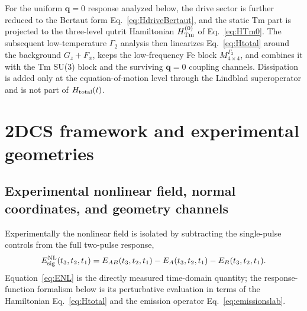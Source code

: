 \documentclass[reprint,amsmath,amssymb,aps,prb,longbibliography]{revtex4-2}
\begin{document}
For the uniform $\mathbf q=0$ response analyzed below, the drive sector is
further reduced to the Bertaut form Eq.~\eqref{eq:HdriveBertaut}, and the
static Tm part is projected to the three-level qutrit Hamiltonian
$H_{\rm Tm}^{(0)}$ of Eq.~\eqref{eq:HTm0}. The subsequent low-temperature
$\Gamma_2$ analysis then linearizes Eq.~\eqref{eq:Htotal} around the
background $G_z+F_x$, keeps the low-frequency Fe block
$M^{\Gamma_2}_{4\times 4}$, and combines it with the Tm SU(3) block and
the surviving $\mathbf q=0$ coupling channels. Dissipation is added only
at the equation-of-motion level through the Lindblad superoperator and is
not part of $H_{\rm total}(t)$.

\section{2DCS framework and experimental geometries}
\label{sec:2dcsframework}

\subsection{Experimental nonlinear field, normal coordinates, and geometry channels}

Experimentally the nonlinear field is isolated by subtracting the
single-pulse controls from the full two-pulse response,
\begin{equation}
E_{\rm sig}^{\rm NL}(t_3,t_2,t_1)
= E_{AB}(t_3,t_2,t_1) - E_A(t_3,t_2,t_1) - E_B(t_3,t_2,t_1).
\label{eq:ENL}
\end{equation}
Equation~\eqref{eq:ENL} is the directly measured time-domain quantity;
the response-function formalism below is its perturbative evaluation in
terms of the Hamiltonian Eq.~\eqref{eq:Htotal} and the emission operator
Eq.~\eqref{eq:emissionslab}.
\end{document}
